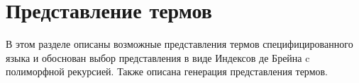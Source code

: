 \section{Представление термов}\label{term_repr}
В этом разделе описаны возможные представления термов специфицированного языка и обоснован выбор представления в виде Индексов де Брейна\cite{de_brujin} c полиморфной рекурсией. Также описана генерация представления термов.






